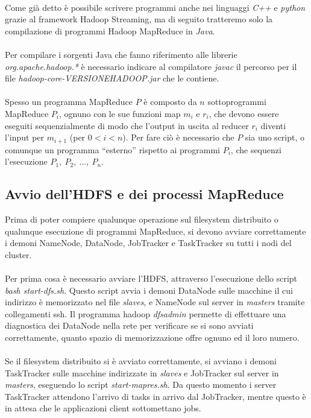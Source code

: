 \documentclass[a4paper,11pt]{report}
\begin{document}
\paragraph{}
Come già detto è possibile scrivere programmi anche nei linguaggi \emph{C++} e \emph{python} grazie al framework Hadoop Streaming, ma di
seguito tratteremo solo la compilazione
di programmi Hadoop MapReduce in \emph{Java}.
\paragraph{}
Per compilare i sorgenti Java che fanno riferimento alle librerie \emph{org.apache.hadoop.*} è necessario indicare al compilatore
\emph{javac} il percorso per il file 
\emph{hadoop-core-VERSIONE\textunderscore HADOOP.jar} che le contiene.
\paragraph{}
Spesso un programma MapReduce $P$ è composto da $n$ sottoprogrammi MapReduce $P_i$, ognuno con le sue funzioni map $m_i$ e $r_i$, che devono
essere eseguiti sequenzialmente di 
modo che l'output in uscita al reducer $r_i$ diventi l'input per $m_{i+1}$ (per $0<i<n$). Per fare ciò è necessario che $P$ sia uno script,
o comunque un programma ``esterno'' rispetto
ai programmi $P_i$, che sequenzi l'esecuzione $P_1,\ P_2,\ ...,\ P_n$.

\subsection{Avvio dell'HDFS e dei processi MapReduce}
Prima di poter compiere qualunque operazione sul filesystem distribuito o qualunque esecuzione di programmi MapReduce, si devono avviare
correttamente i demoni NameNode, DataNode,
JobTracker e TaskTracker su tutti i nodi del cluster.
\paragraph{}
Per prima cosa è necessario avviare l'HDFS, attraverso l'esecuzione dello script \emph{bash start-dfs.sh}.
Questo script avvia i demoni DataNode sulle macchine il cui indirizzo è memorizzato nel file \emph{slaves}, e NameNode sul server in
\emph{masters} tramite collegamenti ssh.
Il programma hadoop \emph{dfsadmin} permette di effettuare una diagnostica dei DataNode nella rete per verificare se si sono avviati
correttamente, quanto spazio  
di memorizzazione offre ognuno ed il loro numero.
\paragraph{}
Se il filesystem distribuito si è avviato correttamente, si avviano i demoni TaskTracker sulle macchine indirizzate in \emph{slaves} e
JobTracker sul server in \emph{masters}, 
eseguendo lo script \emph{start-mapres.sh}.
Da questo momento i server TaskTracker attendono l'arrivo di tasks in arrivo dal JobTracker, mentre questo è in attesa che le applicazioni
client sottomettano jobs.
\end{document}
